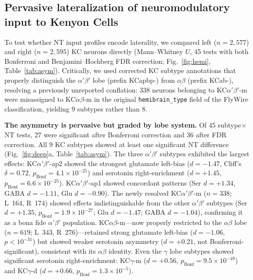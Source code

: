 \documentclass[10pt]{article}
\begin{document}
\FloatBarrier

\subsection*{Pervasive lateralization of neuromodulatory input to Kenyon Cells}

To test whether NT input profiles encode laterality, we compared left ($n=2{,}577$) and right ($n=2{,}595$) KC neurons directly (Mann--Whitney $U$, 45 tests with both Bonferroni and Benjamini--Hochberg FDR correction; Fig.~\ref{fig:hemi}, Table~\ref{tab:asym}). Critically, we used corrected KC subtype annotations that properly distinguish the $\alpha'\beta'$ lobe (prefix KCapbp-) from $\alpha\beta$ (prefix KCab-), resolving a previously unreported conflation: 338 neurons belonging to KC$\alpha'\beta'$-m were misassigned to KC$\alpha\beta$-m in the original \texttt{hemibrain\_type} field of the FlyWire classification, yielding 9 subtypes rather than 8.

\textbf{The asymmetry is pervasive but graded by lobe system.} Of 45 subtype$\times$NT tests, 27 were significant after Bonferroni correction and 36 after FDR correction. All 9 KC subtypes showed at least one significant NT difference (Fig.~\ref{fig:deep}a, Table~\ref{tab:asym}). The three $\alpha'\beta'$ subtypes exhibited the largest effects: KC$\alpha'\beta'$-ap2 showed the strongest glutamate left-bias ($d = -1.47$, Cliff's $\delta = 0.72$, $p_\mathrm{Bonf} = 4.1 \times 10^{-25}$) and serotonin right-enrichment ($d = +1.45$, $p_\mathrm{Bonf} = 6.6 \times 10^{-25}$). KC$\alpha'\beta'$-ap1 showed concordant patterns (Ser $d = +1.34$, GABA $d = -1.11$, Glu $d = -0.90$). The newly resolved KC$\alpha'\beta'$-m ($n = 338$; L~164, R~174) showed effects indistinguishable from the other $\alpha'\beta'$ subtypes (Ser $d = +1.35$, $p_\mathrm{Bonf} = 1.9 \times 10^{-27}$; Glu $d = -1.47$; GABA $d = -1.04$), confirming it as a bona fide $\alpha'\beta'$ population. KC$\alpha\beta$-m---now properly restricted to the $\alpha\beta$ lobe ($n = 619$; L~343, R~276)---retained strong glutamate left-bias ($d = -1.06$, $p < 10^{-31}$) but showed weaker serotonin asymmetry ($d = +0.21$, not Bonferroni-significant), consistent with its $\alpha\beta$ identity. Even the $\gamma$ lobe subtypes showed significant serotonin right-enrichment: KC$\gamma$-m ($d = +0.56$, $p_\mathrm{Bonf} = 9.5 \times 10^{-48}$) and KC$\gamma$-d ($d = +0.66$, $p_\mathrm{Bonf} = 1.3 \times 10^{-5}$).
\end{document}
